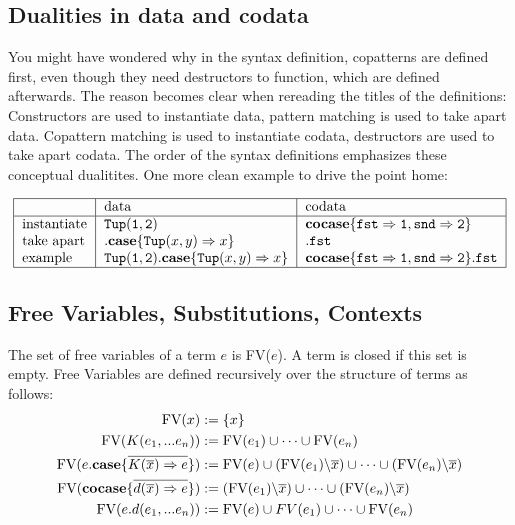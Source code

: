 \documentclass[twoside,12pt,a4paper]{article}
\begin{document}
\subsection{Dualities in data and codata}
You might have wondered why in the syntax definition, copatterns are defined first, even though they need destructors to function, which are defined afterwards.
The reason becomes clear when rereading the titles of the definitions:
Constructors are used to instantiate data, pattern matching is used to take apart data.
Copattern matching is used to instantiate codata, destructors are used to take apart codata.
The order of the syntax definitions emphasizes these conceptual dualitites.
One more clean example to drive the point home:  

\begin{example}
    \begin{align*}
        \begin{tabular}{|l | l | l|}
            \hline
            & data & codata\\
            \hline
            instantiate & $\mathtt{Tup(1,2)}$&  $\excopatmatch{\mathtt{fst\Rightarrow 1, snd\Rightarrow 2}}$\\
            take apart & $.\expatmatch{\mathttbrackets{Tup}{x, y}\Rightarrow x}$ & $.\mathtt{fst}$\\
            example & $\mathtt{Tup(1,2)}.\expatmatch{\mathttbrackets{Tup}{x, y}\Rightarrow x}$&$\excopatmatch{\mathtt{fst\Rightarrow 1, snd\Rightarrow 2}}.\mathtt{fst}$\\
           \hline
       \end{tabular}
    \end{align*}        
\end{example} %

\subsection{Free Variables, Substitutions, Contexts}

\begin{definition}
    The set of free variables of a term $e$ is FV($e$). A term is closed if this set is empty.
    Free Variables are defined recursively over the structure of terms as follows:
    \begin{align*}
        \begin{split}
            \text{FV}(x) &:= \{x\}\\
            \text{FV}(K(e_1,...e_n)) &:= \text{FV}(e_1) \cup \dots\cup \text{FV}(e_n)\\
            \text{FV}(e.\textbf{case}\{\overline{K(\overline{x})\Rightarrow e}\}) &:= \text{FV}(e)\cup (\text{FV}(e_1)\backslash\overline{x})\cup \dots\cup (\text{FV}(e_n)\backslash\overline{x})\\
            \text{FV}(\textbf{cocase}\{\overline{d(\overline{x})\Rightarrow e}\}) &:= (\text{FV}(e_1)\backslash\overline{x})\cup \dots\cup (\text{FV}(e_n)\backslash\overline{x})\\
            \text{FV}(e.d(e_1,...e_n)) &:= \text{FV}(e)\cup FV(e_1) \cup \dots \cup \text{FV}(e_n)    
        \end{split}
    \end{align*}
\end{definition}
\end{document}
